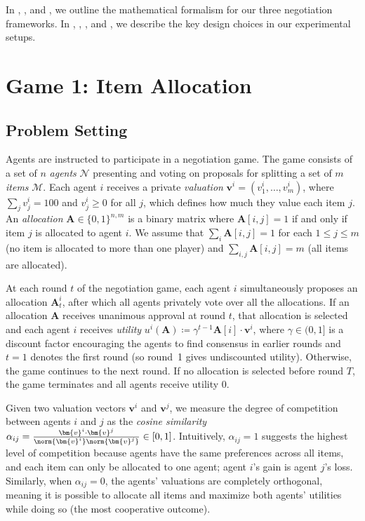In , , and , we outline the mathematical formalism for our three negotiation frameworks. In , , , and , we describe the key design choices in our experimental setups.

\section{Game 1: Item Allocation}

\subsection{Problem Setting}
\label{sec:game_1_problem_setting}

Agents are instructed to participate in a negotiation game.
The game consists of a set of $n$ \emph{agents} $\mathcal{N}$ presenting and voting on proposals for splitting a set of $m$ \emph{items} $\mathcal{M}$.
Each agent $i$ receives a private \emph{valuation} $\bm{v}^{i} = ( v^{i}_{1} , \dots,  v^{i}_{m} )$, where $\sum_j v^{i}_{j} = 100$ and $v^{i}_{j} \geq 0$ for all $j$, which defines how much they value each item $j$.
An \emph{allocation} $\bm{A} \in \{0,1\}^{n,m}$ is a binary matrix where $\bm{A}[i,j] = 1$ if and only if item $j$ is allocated to agent $i$.
We assume that $\sum_i \bm{A}[i,j] = 1$ for each $1 \leq j \leq m$ (no item is allocated to more than one player) and $\sum_{i,j} \bm{A}[i,j] = m$ (all items are allocated).

At each round $t$ of the negotiation game, each agent $i$ simultaneously proposes an allocation $\bm{A}^i_t$, after which all agents privately vote over all the allocations.
If an allocation $\bm{A}$ receives unanimous approval at round $t$, that allocation is selected and each agent $i$ receives \emph{utility} $u^i(\bm{A}) \coloneqq \gamma^{t-1} \bm{A}[i] \cdot \bm{v}^{i}$, where $\gamma \in (0,1]$ is a discount factor encouraging the agents to find consensus in earlier rounds and $t=1$ denotes the first round (so round~1 gives undiscounted utility).
Otherwise, the game continues to the next round.
If no allocation is selected before round $T$, the game terminates and all agents receive utility 0.

Given two valuation vectors $\bm{v}^i$ and $\bm{v}^j$, we measure the degree of competition between agents $i$ and $j$ as the \emph{cosine similarity} $\alpha_{ij} = \frac{{\bm{v}^i} \cdot \bm{v}^j}{\norm{\bm{v}^i} \norm{\bm{v}^j}} \in [0,1]$.
Intuitively, $\alpha_{ij} = 1$ suggests the highest level of competition because agents have the same preferences across all items, and each item can only be allocated to one agent; agent $i$'s gain is agent $j$'s loss.
Similarly, when $\alpha_{ij} = 0$, the agents' valuations are completely orthogonal, meaning it is possible to allocate all items and maximize both agents' utilities while doing so (the most cooperative outcome).

